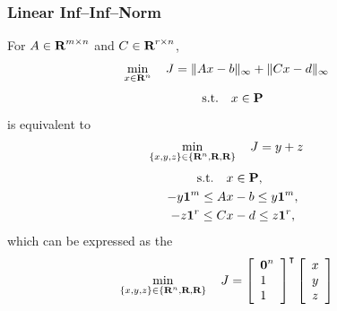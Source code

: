 \documentclass{article}
\begin{document}
\subsubsection{Linear Inf--Inf--Norm}

    For $A\in\textbf{R}^{m\times n}$ and $C\in\textbf{R}^{r\times n}$,
    \begin{align*}
        \min_{x\in\textbf{R}^n}\quad J & = \|A x-b\|_\infty + \|C x - d\|_\infty
    \end{align*}
    \begin{align*}
        \text{s.t.}\quad x\in\textbf{P}
    \end{align*}
    is equivalent to
    \begin{align*}
    \min_{\{x,y,z\}\in\{\textbf{R}^n,\textbf{R},\textbf{R}\}}
    \quad J & = y + z
    \end{align*}
    \begin{align*}
        \text{s.t.}\quad &x\in\textbf{P},
        \\
        -y\textbf{1}^m \leq A &x - b \leq y\textbf{1}^m,\\
        -z\textbf{1}^r \leq C &x - d \leq z\textbf{1}^r,
    \end{align*}
    which can be expressed as the \LP
    \begin{align*}
        \min_{\{x,y,z\}\in\{\textbf{R}^n,\textbf{R},\textbf{R}\}} \quad 
        J & = 
        \left[\begin{array}{l}
            \textbf{0}^n
            \\
            1
            \\
            1
        \end{array}\right]^\intercal
        \left[\begin{array}{c}
            x   \\
            y \\
            z
        \end{array}\right]
    \end{align*}
\end{document}
